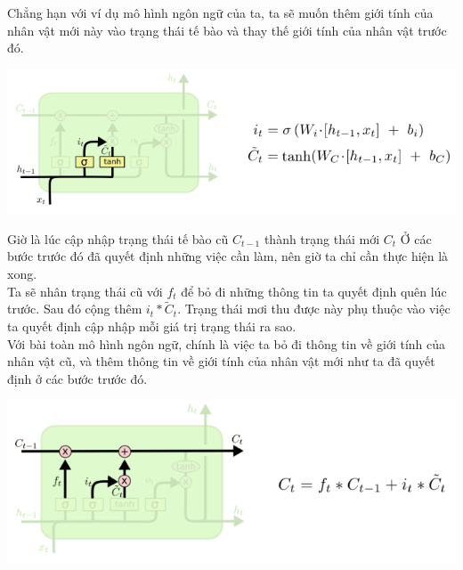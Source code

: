 Chẳng hạn với ví dụ mô hình ngôn ngữ của ta, ta sẽ muốn thêm giới tính của nhân vật mới này vào trạng thái tế bào và thay thế giới tính của nhân vật trước đó.
\begin{center}
    \includegraphics[scale=.5]{image/chapter6/bt2.png}
    \begin{figure}[htp]
    \begin{center}
     
    \end{center}
    \end{figure}
\end{center}
Giờ là lúc cập nhập trạng thái tế bào cũ $C_{t-1}$ thành trạng thái mới $C_{t}$ Ở các bước trước đó đã quyết định những việc cần làm, nên giờ ta chỉ cần thực hiện là xong.\\
Ta sẽ nhân trạng thái cũ với $f_{t}$ để bỏ đi những thông tin ta quyết định quên lúc trước. Sau đó cộng thêm $i_{t} * \widetilde{C}_{t}$. Trạng thái mơi thu được này phụ thuộc vào việc ta quyết định cập nhập mỗi giá trị trạng thái ra sao.\\
Với bài toàn mô hình ngôn ngữ, chính là việc ta bỏ đi thông tin về giới tính của nhân vật cũ, và thêm thông tin về giới tính của nhân vật mới như ta đã quyết định ở các bước trước đó.
\begin{center}
    \includegraphics[scale=.5]{image/chapter6/bt3.png}
    \begin{figure}[htp]
    \begin{center}
     
    \end{center}
    \end{figure}
\end{center}
